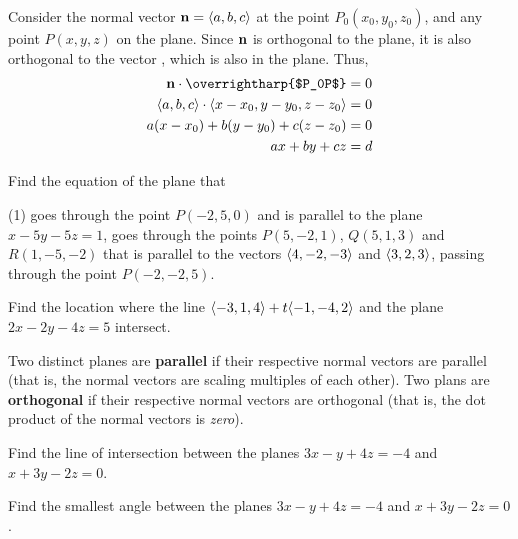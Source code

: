 \documentclass[mathNotesPreamble]{subfiles}
\begin{document}
  Consider the normal vector ${\mathbf{n}}={\left\langle a,b,c \right\rangle}$ at the point $P_0(x_0,y_0,z_0)$, and any point $P(x,y,z)$ on the plane. Since ${\mathbf{n}}$ is orthogonal to the plane, it is also orthogonal to the vector , which is also in the plane. Thus,
    \begin{align*}
      \vecn\cdot\textnormal{\overrightharp{$P_0P$}}&=0\\
      \bracket{a,b,c}\cdot\bracket{x-x_0,y-y_0,z-z_0}&=0\\
      a(x-x_0)+b(y-y_0)+c(z-z_0)&=0\\
      ax+by+cz&=d
    \end{align*}

  \noindent
  \pagebreak
  \begin{ex*}
    Find the equation of the plane that
    \begin{tasks}[after-item-skip=\stretch{1}, label=\textbullet](1)
      \task goes through the point $P(-2,5,0)$ and is parallel to the plane $x-5y-5z=1$,
      \task goes through the points $P(5,-2,1)$, $Q(5,1,3)$ and $R(1,-5,-2)$
      \task that is parallel to the vectors ${\left\langle 4,-2,-3 \right\rangle}$ and ${\left\langle 3,2,3 \right\rangle}$, passing through the point $P(-2,-2,5)$.
    \end{tasks}
  \end{ex*}
  \pagebreak

  \begin{ex*}
    Find the location where the line ${\left\langle -3,1,4 \right\rangle}+t{\left\langle -1,-4,2 \right\rangle}$ and the plane $2x-2y-4z=5$ intersect.
  \end{ex*}

  \begin{defn*}
    Two distinct planes are \textbf{parallel} if their respective normal vectors are parallel (that is, the normal vectors are scaling multiples of each other). Two plans are \textbf{orthogonal} if their respective normal vectors are orthogonal (that is, the dot product of the normal vectors is \textit{zero}).
  \end{defn*}
  \begin{ex*}
    Find the line of intersection between the planes $3x-y+4z=-4$ and $x+3y-2z=0$.
  \end{ex*}

  \begin{ex*}
    Find the smallest angle between the planes $3x-y+4z=-4$ and $x+3y-2z=0$.
  \end{ex*}

  \pagebreak
  
\end{document}

